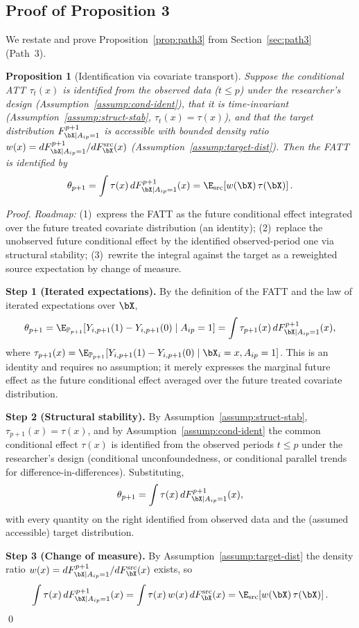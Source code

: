 \documentclass{article}
\newtheorem*{proposition*}{Proposition}
\renewcommand{\P}{\mathbb{P}}
\begin{document}
\subsection{Proof of Proposition 3}\label{app:prop3-path3}

We restate and prove Proposition~\ref{prop:path3} from Section~\ref{sec:path3} (Path~3).

\begin{proposition*}[Identification via covariate transport]
Suppose the conditional ATT $\tau_t(x)$ is identified from the observed data ($t \leq p$) under the researcher's design (Assumption~\ref{assump:cond-ident}), that it is time-invariant (Assumption~\ref{assump:struct-stab}, $\tau_t(x) = \tau(x)$), and that the target distribution $F_{\bX | A_{ip}=1}^{p+1}$ is accessible with bounded density ratio $w(x) = dF_{\bX | A_{ip}=1}^{p+1}/dF_{\bX}^{\mathrm{src}}(x)$ (Assumption~\ref{assump:target-dist}). Then the FATT is identified by
\[
\theta_{p+1} = \int \tau(x) \, dF_{\bX | A_{ip}=1}^{p+1}(x) = \E_{\mathrm{src}}\!\left[w(\bX)\, \tau(\bX)\right].
\]
\end{proposition*}

\begin{proof}
\textit{Roadmap:} (1)~express the FATT as the future conditional effect integrated over the future treated covariate distribution (an identity); (2)~replace the unobserved future conditional effect by the identified observed-period one via structural stability; (3)~rewrite the integral against the target as a reweighted source expectation by change of measure.

\textbf{Step 1 (Iterated expectations).} By the definition of the FATT and the law of iterated expectations over $\bX$,
\[
\theta_{p+1} = \E_{\P_{p+1}}[Y_{i,p+1}(1) - Y_{i,p+1}(0) \mid A_{ip} = 1] = \int \tau_{p+1}(x) \, dF_{\bX | A_{ip}=1}^{p+1}(x),
\]
where $\tau_{p+1}(x) = \E_{\P_{p+1}}[Y_{i,p+1}(1) - Y_{i,p+1}(0) \mid \bX_i = x, A_{ip} = 1]$. This is an identity and requires no assumption; it merely expresses the marginal future effect as the future conditional effect averaged over the future treated covariate distribution.

\textbf{Step 2 (Structural stability).} By Assumption~\ref{assump:struct-stab}, $\tau_{p+1}(x) = \tau(x)$, and by Assumption~\ref{assump:cond-ident} the common conditional effect $\tau(x)$ is identified from the observed periods $t \leq p$ under the researcher's design (conditional unconfoundedness, or conditional parallel trends for difference-in-differences). Substituting,
\[
\theta_{p+1} = \int \tau(x) \, dF_{\bX | A_{ip}=1}^{p+1}(x),
\]
with every quantity on the right identified from observed data and the (assumed accessible) target distribution.

\textbf{Step 3 (Change of measure).} By Assumption~\ref{assump:target-dist} the density ratio $w(x) = dF_{\bX | A_{ip}=1}^{p+1}/dF_{\bX}^{\mathrm{src}}(x)$ exists, so
\[
\int \tau(x) \, dF_{\bX | A_{ip}=1}^{p+1}(x) = \int \tau(x)\, w(x) \, dF_{\bX}^{\mathrm{src}}(x) = \E_{\mathrm{src}}\!\left[w(\bX)\, \tau(\bX)\right].
\]
\qed
\end{proof}
\end{document}

